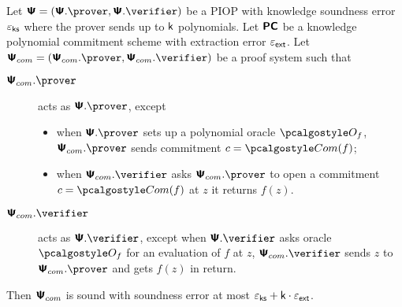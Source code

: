 \documentclass[runningheads,11pt]{llncs}
\begin{document}
\begin{lemma}
  Let $\PS = (\PS.\prover, \PS.\verifier)$ be a PIOP with knowledge soundness error
  $\varepsilon_{\mathsf{ks}}$ where the prover sends up to $\mathsf{k}$ polynomials. Let $\bm{\mathsf{PC}}$ be a
  knowledge polynomial commitment scheme with extraction error $\varepsilon_{\mathsf{ext}}$. Let
  $\PSc = (\PSc.\prover, \PSc.\verifier)$ be a proof system such that
  \begin{description}
  \item[$\PSc.\prover$] acts as $\PS.\prover$, except
    \begin{itemize}
    \item when $\PS.\prover$ sets up a polynomial oracle $\oracleo_f$,
      $\PSc.\prover$ sends commitment $c = \com(f)$;
    \item when $\PSc.\verifier$ asks $\PSc.\prover$ to open a commitment
      $c = \com(f)$ at $z$ it returns $f(z)$.
  \end{itemize}
  \item[$\PSc.\verifier$] acts as $\PS.\verifier$, except when $\PS.\verifier$
    asks oracle $\oracleo_f$ for an evaluation of $f$ at $z$, $\PSc.\verifier$
    sends $z$ to $\PSc.\prover$ and gets $f(z)$ in return.
  \end{description}
  Then $\bm{\mathsf{\Psi}}_{com}$ is sound with soundness error at most $\varepsilon_{\mathsf{ks}} + \mathsf{k} \cdot \varepsilon_{\mathsf{ext}}$.
\end{lemma}
\end{document}
